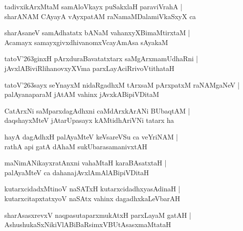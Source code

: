 \documentclass[twoside,12pt,openright]{book}
\def\S{\char'263}
\newcounter{shloka}[chapter]
\begin{document}
\begin{shloka}%
tadivxikArxMtaM samAloVkayx puSakxlaH paraviVrahA |\\
sharANAM CAyayA vAyxpatAM raNamaMDalamiVkaSxyX ca 
\end{shloka}

\begin{shloka}%
sharAsaneV samAdhatatx bANaM vahanxyXBimaMtirxtaM |\\
Acamayx samayxgivxdhivanomxVcayAmAsa sAyakaM 
\end{shloka}

\begin{shloka}%
tatoV\S ginxH pArxduraBavatatxtarx saMgArxmamUdhaRni |\\
jAvxlABiviRlihanovxyXVma parxLayAciRrivoVtithataH 
\end{shloka}

\begin{shloka}%
tatoV\S sayx seYnayxM nidaRgadhxM tArxsaM pArxpatxM raNAMgaNeV |\\
palAyanaparaM jAtAM vahinx jAvxkABipiVDitaM 
\end{shloka}

\begin{shloka}%
CatArxNi saMparxdagAdhxni caMdArxkArANi BUbaqtAM |\\
daqshayxMteV jAtarUpasayx kAMtidhAriVNi tatarx ha 
\end{shloka}

\begin{shloka}%
hayA dagAdhxH palAyaMteV keVsareVSu ca veYriNAM |\\
rathA api gatA dAhaM sukUbarasamanivxtAH
\end{shloka}

\begin{shloka}%
maNimANikayxratAnxni vahaMtaH karaBAsatxtaH |\\
palAyaMteV ca dahanajAvxlAmAlABipiVDitaH 
\end{shloka}

\begin{shloka}%
kutarxcidadxMtinoV naSATxH kutarxcidadhxyasAdinaH |\\
kutarxcitapxtatxyoV naSAtx vahinx dagadhxkaLeVbarAH 
\end{shloka}

\begin{shloka}%
sharAsasxrevxV naqpasutaparxmukAtxH parxLayaM gatAH |\\
AshushukaSxNikiVlABiBaRsimxVBUtAsasxmaMtataH
\end{shloka}
\end{document}
